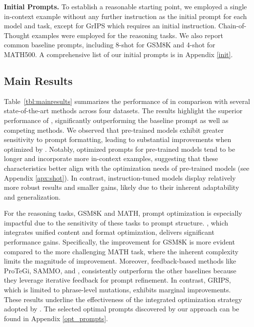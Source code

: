 \noindent \textbf{Initial Prompts.} 
To establish a reasonable starting point, we employed a single in-context example without any further instruction as the initial prompt for each model and task, except for GrIPS which requires an initial instruction. Chain-of-Thought examples were employed for the reasoning tasks.  We also report common baseline prompts, including 8-shot for GSM8K and 4-shot for MATH500. A comprehensive list of our initial prompts is in Appendix \ref{init}.

\subsection{Main Results}
Table~\ref{tbl:mainresults} summarizes the performance of \sysname{} in comparison with several state-of-the-art methods across four datasets.
The results highlight the superior performance of \sysname{}, significantly outperforming the baseline prompt as well as competing methods.
We observed that pre-trained models exhibit greater sensitivity to prompt formatting, leading to substantial improvements when optimized by \sysname{}.
Notably, optimized prompts for pre-trained models tend to be longer and incorporate more in-context examples, suggesting that these characteristics better align with the optimization needs of pre-trained models (see Appendix \ref{apx:shot}).
In contrast, instruction-tuned models display relatively more robust results and smaller gains, likely due to their inherent adaptability and generalization.

For the reasoning tasks, GSM8K and MATH, prompt optimization is especially impactful due to the sensitivity of these tasks to prompt structure.
\sysname{}, which integrates unified content and format optimization, delivers significant performance gains. Specifically, the improvement for GSM8K is more evident compared to the more challenging MATH task, where the inherent complexity limits the magnitude of improvement.
Moreover, feedback-based methods like ProTeGi, SAMMO, and \sysname{}, consistently outperform the other baselines because they leverage iterative feedback for prompt refinement. In contrast, GRIPS, which is limited to phrase-level mutations, exhibits marginal improvements. These results underline the effectiveness of the integrated optimization strategy adopted by \sysname{}.  The selected optimal prompts discovered by our approach can be found in Appendix \ref{opt_prompts}.


